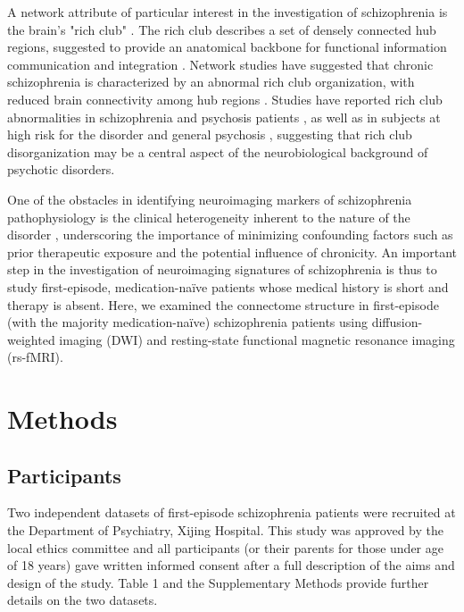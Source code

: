 \begin{refsection}
A network attribute of particular interest in the investigation of schizophrenia is the brain's "rich club" \citep{vanDenHeuvel2011RichclubOO}.  The rich club describes a set of densely connected hub regions, suggested to provide an anatomical backbone for functional information communication and integration \citep{Abraham2017DerivingRB,vanDenHeuvel2012HighcostHB}. Network studies have suggested that chronic schizophrenia is characterized by an abnormal rich club organization, with reduced brain connectivity among hub regions \citep{vanDenHeuvel2013AbnormalRC}. Studies have reported rich club abnormalities in schizophrenia and psychosis patients \citep{Yeo2016GraphMO,Klauser2017WhiteMD,Crossley2017ConnectomicCO}, as well as in subjects at high risk for the disorder \citep{Collin2014ImpairedRC} and general psychosis \citep{Schmidt2017StructuralND}, suggesting that rich club disorganization may be a central aspect of the neurobiological background of psychotic disorders.

One of the obstacles in identifying neuroimaging markers of schizophrenia pathophysiology is the clinical heterogeneity inherent to the nature of the disorder \citep{Millan2016AlteringTC}, underscoring the importance of minimizing confounding factors such as prior therapeutic exposure and the potential influence of chronicity. An important step in the investigation of neuroimaging signatures of schizophrenia is thus to study first-episode, medication-na\"{i}ve patients whose medical history is short and therapy is absent. Here, we examined the connectome structure in first-episode (with the majority medication-na\"{i}ve) schizophrenia patients using diffusion-weighted imaging (DWI) and resting-state functional magnetic resonance imaging (rs-fMRI).

\section*{Methods}
\subsection*{Participants}
Two independent datasets of first-episode schizophrenia patients were recruited at the Department of Psychiatry, Xijing Hospital. This study was approved by the local ethics committee and all participants (or their parents for those under age of 18 years) gave written informed consent after a full description of the aims and design of the study. Table 1 and the Supplementary Methods provide further details on the two datasets.


\end{refsection}
